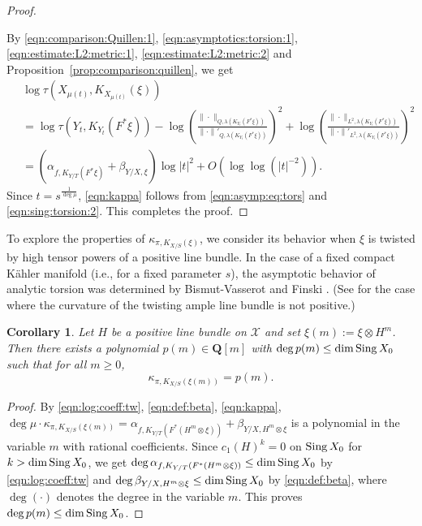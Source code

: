 \documentclass[amscd, leqno]{amsart}
\theoremstyle{plain}
\newtheorem{corollary}[theorem]{Corollary}
\theoremstyle{definition}
\theoremstyle{remark}
\newenvironment{pf}{\begin{proof}}{\end{proof}}
\begin{document}
\begin{pf}
\begin{equation}
\end{equation}
\par
By \eqref{eqn:comparison:Quillen:1}, \eqref{eqn:asymptotics:torsion:1}, \eqref{eqn:estimate:L2:metric:1}, \eqref{eqn:estimate:L2:metric:2}
and Proposition~\ref{prop:comparison:quillen}, we get
\begin{equation}
\label{eqn:sing:torsion:2}
\begin{aligned}
\,&
\log\tau(X_{\mu(t)}, K_{X_{\mu(t)}}(\xi))
\\
&=
\log\tau(Y_{t}, K_{Y_{t}}(F^{*}\xi))
-
\log\left(\frac{\|\cdot\|_{Q,\lambda(K_{Y_{t}}(F^{*}\xi))}}{\|\cdot\|'_{Q,\lambda(K_{Y_{t}}(F^{*}\xi))}}\right)^{2}
+
\log\left(\frac{\|\cdot\|_{L^{2},\lambda(K_{Y_{t}}(F^{*}\xi))}}{\|\cdot\|'_{L^{2},\lambda(K_{Y_{t}}(F^{*}\xi))}}\right)^{2}
\\
&=
( \alpha_{f, K_{Y/T}(F^{*}\xi)} + \beta_{Y/X, \xi} ) \log | t |^{2} + O\left( \log\log(| t |^{-2}) \right).
\end{aligned}
\end{equation}
Since $t=s^{\frac{1}{\deg\mu}}$, \eqref{eqn:kappa} follows from \eqref{eqn:asymp:eq:tors} and \eqref{eqn:sing:torsion:2}. 
This completes the proof.
\end{pf}


To explore the properties of $\kappa_{\pi, K_{X/S}(\xi)}$, we consider its behavior when $\xi$ is twisted by high tensor powers of 
a positive line bundle. In the case of a fixed compact K\"ahler manifold (i.e., for a fixed parameter $s$), 
the asymptotic behavior of analytic torsion was determined by Bismut-Vasserot \cite{BismutVasserot89} and Finski \cite{Finski18}.
(See \cite{BermanBoucksom10} for the case where the curvature of the twisting ample line bundle is not positive.)


\begin{corollary}
\label{cor:dom:term:asym}
Let $H$ be a positive line bundle on ${\mathcal X}$ and set $\xi(m) := \xi\otimes H^{m}$. 
Then there exists a polynomial $p(m) \in {\mathbf Q}[m]$ with $\deg p(m) \leq \dim {\rm Sing}\,X_{0}$ such that for all $m \geq 0$,
$$
\kappa_{\pi, K_{X/S}(\xi(m))} = p(m).
$$
\end{corollary}

\begin{pf}
By \eqref{eqn:log:coeff:tw}, \eqref{eqn:def:beta}, \eqref{eqn:kappa}, 
$\deg\mu \cdot \kappa_{\pi, K_{X/S}(\xi(m))} = \alpha_{f, K_{Y/T}(F^{*}(H^{m}\otimes \xi))} + \beta_{Y/X, H^{m}\otimes  \xi }$ 
is a polynomial in the variable $m$ with rational coefficients. 
Since $c_{1}(H)^{k}=0$ on ${\rm Sing}\,X_{0}$ for $k > \dim {\rm Sing}\,X_{0}$, we get
$\deg \alpha_{f, K_{Y/T}(F^{*}(H^{m}\otimes \xi))} \leq \dim {\rm Sing}\,X_{0}$ by \eqref{eqn:log:coeff:tw} and
$\deg \beta_{Y/X, H^{m}\otimes  \xi } \leq \dim {\rm Sing}\,X_{0}$ by \eqref{eqn:def:beta}, 
where $\deg(\cdot)$ denotes the degree in the variable $m$.
This proves $\deg p(m) \leq \dim {\rm Sing}\,X_{0}$.
\end{pf}
\end{document}
